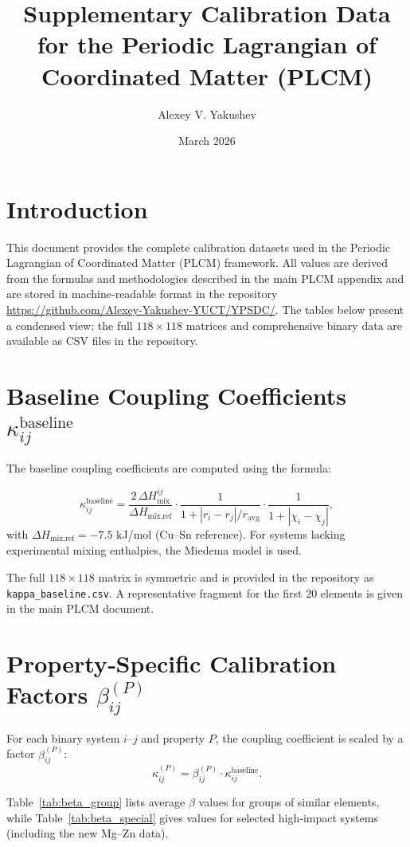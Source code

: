 \documentclass[12pt,a4paper]{article}
\title{Supplementary Calibration Data for the Periodic Lagrangian of Coordinated Matter (PLCM)}
\author{Alexey V. Yakushev}
\date{March 2026}
\begin{document}
	\maketitle
	
	\tableofcontents
	\newpage
	
	\section{Introduction}
	This document provides the complete calibration datasets used in the Periodic Lagrangian of Coordinated Matter (PLCM) framework. All values are derived from the formulas and methodologies described in the main PLCM appendix and are stored in machine‑readable format in the repository \url{https://github.com/Alexey-Yakushev-YUCT/YPSDC/}. The tables below present a condensed view; the full $118\times118$ matrices and comprehensive binary data are available as CSV files in the repository.
	
	\section{Baseline Coupling Coefficients $\kappa_{ij}^{\text{baseline}}$}
	The baseline coupling coefficients are computed using the formula:
	
	\[
	\kappa_{ij}^{\text{baseline}} = \frac{2\,\Delta H_{\text{mix}}^{ij}}{\Delta H_{\text{mix,ref}}} \cdot
	\frac{1}{1 + |r_i - r_j|/r_{\text{avg}}} \cdot
	\frac{1}{1 + |\chi_i - \chi_j|},
	\]
	with $\Delta H_{\text{mix,ref}} = -7.5$ kJ/mol (Cu–Sn reference). For systems lacking experimental mixing enthalpies, the Miedema model \cite{Miedema1980} is used.
	
	The full $118\times118$ matrix is symmetric and is provided in the repository as \texttt{kappa\_baseline.csv}. A representative fragment for the first 20 elements is given in the main PLCM document.
	
	\section{Property‑Specific Calibration Factors $\beta_{ij}^{(P)}$}
	For each binary system $i$–$j$ and property $P$, the coupling coefficient is scaled by a factor $\beta_{ij}^{(P)}$:
	\[
	\kappa_{ij}^{(P)} = \beta_{ij}^{(P)} \cdot \kappa_{ij}^{\text{baseline}}.
	\]
	
	Table~\ref{tab:beta_group} lists average $\beta$ values for groups of similar elements, while Table~\ref{tab:beta_special} gives values for selected high‑impact systems (including the new Mg–Zn data).
	
\end{document}
